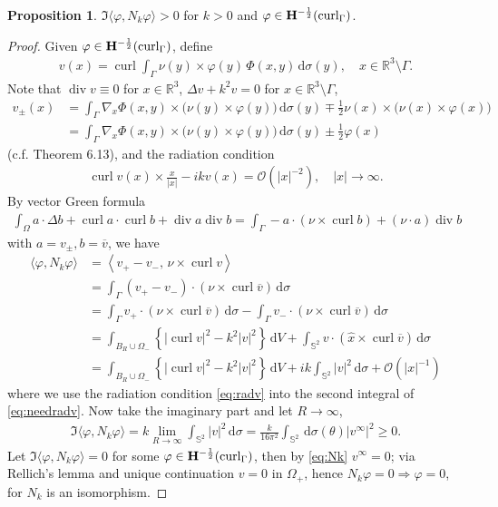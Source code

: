 \documentclass[a4paper,12pt]{article}
\theoremstyle{definition}
\newtheorem{prp}{Proposition}
\newcommand\bdr{\Gamma}
\newcommand\Curl{\curl_\bdr}
\newcommand\Hhm{{\bf H}^{-\frac{1}{2}}}
\newcommand\lTC{\Hhm(\Curl)}
\newcommand\intvnn[1]{\int_{\Omega}#1}
\newcommand\ints[2][y]{\int_{\bdr}#2\,\text{d}\sigma(#1)}
\newcommand\intsn[1]{\int_{\bdr}#1\,\text{d}\sigma}
\newcommand\intsnn[1]{\int_{\bdr}#1}
\newcommand\intbn[1]{\int_{\mathbb{S}^2}#1\,\text{d}\sigma}
\newcommand\intc[2][(\theta)]{\int_{\mathbb{S}^2}#2\,\text{d}\sigma#1}
\DeclareMathOperator\curl{curl}
\DeclareMathOperator\divv{div}
\begin{document}
\begin{prp}
  $\Im\langle\varphi, N_k\varphi\rangle>0$ for $k>0$ and $\varphi\in\lTC$.
\end{prp}

\begin{proof}
  Given $\varphi\in\lTC$, define 
  \begin{align}\label{eq:vv}
    v(x) = \curl\ints{\nu(y)\times\varphi(y)\,\Phi(x,y)},\quad x\in\mathbb{R}^3\setminus\bdr.
  \end{align}
  Note that $\divv v\equiv0$ for $x\in\mathbb{R}^3$, $\Delta v + k^2 v=0$ for $x\in\mathbb{R}^3\setminus\bdr$,
  \begin{align*}
    v_\pm(x) &= \ints{\nabla_x\Phi(x, y)\times\big(\nu(y)\times\varphi(y)\big)}\mp\frac{1}{2}\nu(x)\times\big(\nu(x)\times\varphi(x)\big)\\ 
    &= \ints{\nabla_x\Phi(x, y)\times\big(\nu(y)\times\varphi(y)\big)}\pm\frac{1}{2}\varphi(x)
  \end{align*}
  (c.f. \citet{colton13} Theorem 6.13), and the radiation condition
  \begin{align}\label{eq:radv}
    \curl v(x)\times\frac{x}{|x|} - i k v(x) = \mathcal{O}\left(|x|^{-2}\right),\quad|x|\to\infty. 
  \end{align}
  By vector Green formula 
  \begin{align*}
    \intvnn{a\cdot\Delta b+\curl a\cdot\curl b + \divv a\divv b}=\intsnn{-a\cdot\left(\nu\times\curl b\right)+\left(\nu\cdot a\right)\divv b}
  \end{align*}
  with $a=v_\pm, b=\overline{v}$, we have
  \begin{align}
    \langle\varphi, N_k\varphi\rangle &=\left\langle v_+-v_-,\,\nu\times\curl v\right\rangle\nonumber\\
    &=\intsn{\left(v_+ - v_-\right)\cdot\left(\nu\times\curl \overline{v}\right)}\nonumber\\
    &=\intsn{v_+\cdot\left(\nu\times\curl\overline{v}\right)}- \intsn{v_-\cdot\left(\nu\times\curl\overline{v}\right)}\nonumber\\
    &=\int_{B_R\cup\Omega_-}\left\{|\curl v|^2 - k^2|v|^2\right\}\,\text{d}V + \intbn{v\cdot\left(\hat{x}\times\curl\overline{v}\right)}\label{eq:needradv}\\
    &=\int_{B_R\cup\Omega_-}\left\{|\curl v|^2 - k^2|v|^2\right\}\,\text{d}V + ik\intbn{|v|^2} + \mathcal{O}\left(|x|^{-1}\right)\label{eq:Nk}
  \end{align}
  where we use the radiation condition \eqref{eq:radv} into the second integral of \eqref{eq:needradv}. Now take the imaginary part and let $R\to\infty$, 
  \begin{align*}
    \Im\langle\varphi, N_k\varphi\rangle = k\lim_{R\to\infty}\intbn{|v|^2} = \frac{k}{16\pi^2}\intc{}{|v^\infty|^2}\geqslant 0.
  \end{align*}
  Let $\Im\langle\varphi, N_k\varphi\rangle = 0$ for some $\varphi\in\lTC$, then by \eqref{eq:Nk} $v^\infty=0$; via Rellich's lemma and unique continuation $v=0$ in $\Omega_+$, hence $N_k\varphi=0\Longrightarrow\varphi = 0$, for $N_k$ is an isomorphism.    
\end{proof}
\end{document}
